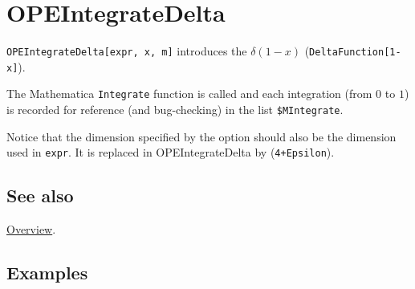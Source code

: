 \documentclass[../FeynCalcManual.tex]{subfiles}
\begin{document}
\hypertarget{opeintegratedelta}{
\section{OPEIntegrateDelta}\label{opeintegratedelta}}

\texttt{OPEIntegrateDelta[\allowbreak{}expr,\ \allowbreak{}x,\ \allowbreak{}m]}
introduces the \(\delta(1-x)\)
(\texttt{DeltaFunction[\allowbreak{}1-x]}).

The Mathematica \texttt{Integrate} function is called and each
integration (from \(0\) to \(1\)) is recorded for reference (and
bug-checking) in the list \texttt{\$MIntegrate}.

Notice that the dimension specified by the option should also be the
dimension used in \texttt{expr}. It is replaced in OPEIntegrateDelta by
(\texttt{4+Epsilon}).

\subsection{See also}

\hyperlink{toc}{Overview}.

\subsection{Examples}
\end{document}
